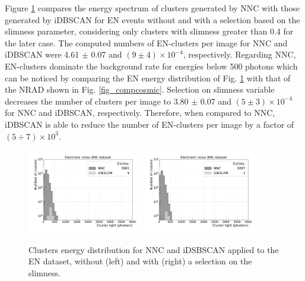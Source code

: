 \documentclass[a4paper,11pt]{article}
\begin{document}
Figure \ref{fig_compnoise} compares the energy spectrum of clusters generated by NNC with those generated by iDBSCAN for EN events without and with a selection based on the slimness parameter, considering only clusters with slimness greater than 0.4 for the later case. The computed numbers of EN-clusters per image for NNC and iDBSCAN were 4.61 $\pm$ 0.07 and $(9 \pm 4)\times 10^{-4}$, respectively.
Regarding NNC, EN-clusters dominate the background rate for energies below 500 photons which can be noticed by comparing the EN energy distribution of Fig. \ref{fig_compnoise} with that of the NRAD shown in Fig. \ref{fig_compcosmic}. Selection on slimness variable decreases the number of clusters per image to 3.80 $\pm$ 0.07 and $(5 \pm 3)\times 10^{-4}$ for NNC and iDBSCAN, respectively. Therefore, when compared to NNC, iDBSCAN is able to reduce the number of EN-clusters per image by a  
factor of $(5\div7)\times 10^3$.

\begin{figure}[ht]
\centering
\includegraphics[width=0.45\textwidth]{LigthYield_No_wo.pdf}
\includegraphics[width=0.45\textwidth]{LigthYield_No_Slim.pdf}
\caption{Clusters energy distribution for NNC and iDSBSCAN applied to the EN dataset, without (left) and with (right) a selection on the slimness.}
\label{fig_compnoise}
\end{figure}
\end{document}
